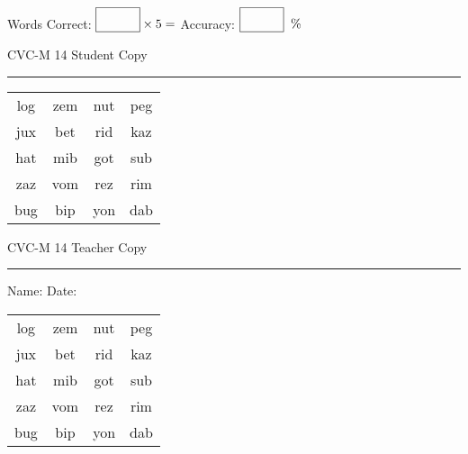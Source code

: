 \documentclass{memoir}
\begin{document}
\small

Words Correct: $\fbox{\phantom{\huge 100}} \times 5 = $ Accuracy: $\fbox{\phantom{\huge 100}}\;\; \%$ 

\vfill

\newpage


\footnotesize \noindent
CVC-M 14 \hfill Student Copy
\smallskip
\hrule

\Large

\setlength{\tabcolsep}{14pt}
\def\arraystretch{2}

{\selectfont


\begin{vplace}[0.5]
\begin{center}
\begin{tabular}{cccc}
log & zem & nut & peg \\
jux & bet & rid & kaz \\
hat & mib & got & sub \\
zaz & vom & rez & rim \\
bug & bip & yon & dab \\
\end{tabular}
\end{center}
\end{vplace}

}

\newpage

\footnotesize \noindent
CVC-M 14 \hfill Teacher Copy
\smallskip
\hrule

\small

\vfill

\noindent
Name: \underline{\hspace{1.75in}} \hfill Date: \underline{\hspace{1in}}

\Large

{\selectfont


\begin{vplace}[0.5]
\begin{center}
\begin{tabular}{cccc}
log & zem & nut & peg \\
jux & bet & rid & kaz \\
hat & mib & got & sub \\
zaz & vom & rez & rim \\
bug & bip & yon & dab \\
\end{tabular}
\end{center}
\end{vplace}



}
\end{document}
